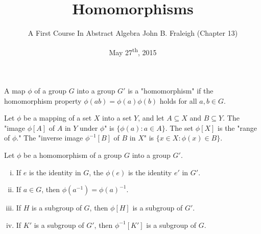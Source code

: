 \documentclass[a4paper,11pt]{article}
\title{Homomorphisms}
\author{A First Course In Abstract Algebra John B. Fraleigh (Chapter 13)}
\date{May 27\textsuperscript{th}, 2015}
\begin{document}
\maketitle
{}

\begin{outline}

    A map \(\phi\) of a group \(G\) into a group \(G'\) is a "homomorphism" if the
    homomorphism property \(\phi(ab) = \phi(a)\phi(b)\) holds for all \(a, b \in G\).
    
    Let \(\phi\) be a mapping of a set \(X\) into a set \(Y\), and let \(A \subseteq X\)
    and \(B \subseteq Y\). The "image \(\phi[A]\) of \(A\) in \(Y\) under \(\phi\)" is \(\{\phi(a) : a \in A\}\).
    The set \(\phi[X]\) is the "range of \(\phi\)." The "inverse image \(\phi^{-1}[B]\) of \(B\) in \(X\)" is
    \(\{x \in X : \phi(x) \in B\}\).
    
    Let \(\phi\) be a homomorphism of a group \(G\) into a group \(G'\).
    \begin{enumerate}[i.]
      \item If \(e\) is the identity in \(G\), the \(\phi(e)\) is the identity \(e'\) in \(G'\).
      \item If \(a \in G\), then \(\phi(a^{-1}) = \phi(a)^{-1}\).
      \item If \(H\) is a subgroup of \(G\), then \(\phi[H]\) is a subgroup of \(G'\).
      \item If \(K'\) is a subgroup of \(G'\), then \(\phi^{-1}[K']\) is a subgroup of \(G\).
    \end{enumerate}
    

\end{outline}
\end{document}
